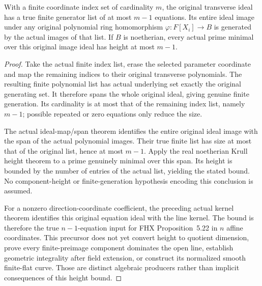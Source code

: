 \begin{theorem}
\label{algebra:line-equations-height-bound}
\leanok
{}
With a finite coordinate index set of cardinality $m$, the original
transverse ideal has a true finite generator list of at most $m-1$
equations. Its entire ideal image under any original polynomial ring
homomorphism $\varphi:F[X_i]\to B$ is generated by the actual images of
that list. If $B$ is noetherian, every actual prime minimal over this
original image ideal has height at most $m-1$.
\end{theorem}
\begin{proof}
Take the actual finite index list, erase the selected parameter
coordinate and map the remaining indices to their original transverse
polynomials. The resulting finite polynomial list has actual underlying
set exactly the original generating set. It therefore spans the whole
original ideal, giving genuine finite generation. Its cardinality is
at most that of the remaining index list, namely $m-1$; possible repeated
or zero equations only reduce the size.

The actual ideal-map/span theorem identifies the entire original ideal
image with the span of the actual polynomial images. Their true finite
list has size at most that of the original list, hence at most $m-1$.
Apply the real noetherian Krull height theorem to a prime genuinely
minimal over this span. Its height is bounded by the number of entries
of the actual list, yielding the stated bound. No component-height or
finite-generation hypothesis encoding this conclusion is assumed.

For a nonzero direction-coordinate coefficient, the preceding actual
kernel theorem identifies this original equation ideal with the line
kernel. The bound is therefore the true $n-1$-equation input for FHX
Proposition~5.22 in $n$ affine coordinates. This precursor does not yet
convert height to quotient dimension, prove every finite-preimage
component dominates the open line, establish geometric integrality
after field extension, or construct its normalized smooth finite-flat
curve. Those are distinct algebraic producers rather than implicit
consequences of this height bound.
\end{proof}
